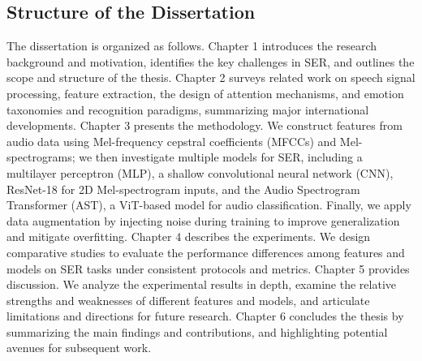 \subsection{Structure of the Dissertation}
The dissertation is organized as follows.
Chapter 1 introduces the research background and motivation, identifies the key challenges in SER, and outlines the scope and structure of the thesis.
Chapter 2 surveys related work on speech signal processing, feature extraction, the design of attention mechanisms, and emotion taxonomies and recognition paradigms, summarizing major international developments.
Chapter 3 presents the methodology. We construct features from audio data using Mel-frequency cepstral coefficients (MFCCs) and Mel-spectrograms; we then investigate multiple models for SER, including a multilayer perceptron (MLP), a shallow convolutional neural network (CNN), ResNet-18 for 2D Mel-spectrogram inputs, and the Audio Spectrogram Transformer (AST), a ViT-based model for audio classification. Finally, we apply data augmentation by injecting noise during training to improve generalization and mitigate overfitting.
Chapter 4 describes the experiments. We design comparative studies to evaluate the performance differences among features and models on SER tasks under consistent protocols and metrics.
Chapter 5 provides discussion. We analyze the experimental results in depth, examine the relative strengths and weaknesses of different features and models, and articulate limitations and directions for future research.
Chapter 6 concludes the thesis by summarizing the main findings and contributions, and highlighting potential avenues for subsequent work.

